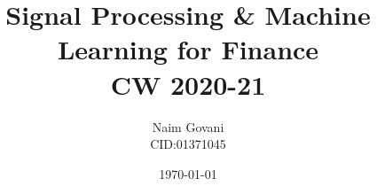 \documentclass[a4paper, twoside]{report}
\begin{document}
    \title{Signal Processing \& Machine Learning for Finance \\ CW 2020-21}
    \author{Naim Govani \\ CID:01371045}
    \date{\today}
    \maketitle

    
    
    
    
    
\end{document}
